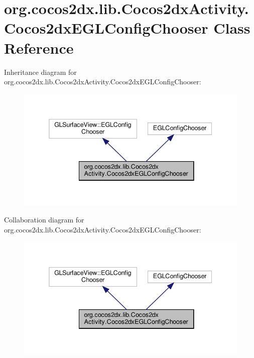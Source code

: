 \hypertarget{classorg_1_1cocos2dx_1_1lib_1_1Cocos2dxActivity_1_1Cocos2dxEGLConfigChooser}{}\section{org.\+cocos2dx.\+lib.\+Cocos2dx\+Activity.\+Cocos2dx\+E\+G\+L\+Config\+Chooser Class Reference}
\label{classorg_1_1cocos2dx_1_1lib_1_1Cocos2dxActivity_1_1Cocos2dxEGLConfigChooser}


Inheritance diagram for org.\+cocos2dx.\+lib.\+Cocos2dx\+Activity.\+Cocos2dx\+E\+G\+L\+Config\+Chooser\+:
\nopagebreak
\begin{figure}[H]
\begin{center}
\leavevmode
\includegraphics[width=338pt]{classorg_1_1cocos2dx_1_1lib_1_1Cocos2dxActivity_1_1Cocos2dxEGLConfigChooser__inherit__graph}
\end{center}
\end{figure}


Collaboration diagram for org.\+cocos2dx.\+lib.\+Cocos2dx\+Activity.\+Cocos2dx\+E\+G\+L\+Config\+Chooser\+:
\nopagebreak
\begin{figure}[H]
\begin{center}
\leavevmode
\includegraphics[width=338pt]{classorg_1_1cocos2dx_1_1lib_1_1Cocos2dxActivity_1_1Cocos2dxEGLConfigChooser__coll__graph}
\end{center}
\end{figure}
